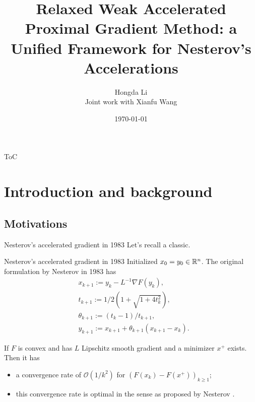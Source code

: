 \documentclass[11pt]{beamer}
\author[Hongda Li]{Hongda Li\\ \vspace{1cm} \tiny{Joint work with Xianfu Wang}}
\title[Thesis Proposal Talk]{
    Relaxed Weak Accelerated Proximal Gradient Method: a Unified Framework for Nesterov's Accelerations
}
\institute[UBCO]{
    University of British Columbia Okanagan
}
\date{\today}
\theoremstyle{definition}
\begin{document}
\begin{frame}
    \titlepage
\end{frame}

\begin{frame}{ToC}
    \tableofcontents
\end{frame}

\section{Introduction and background}
    \subsection{Motivations}
        \begin{frame}{Nesterov's accelerated gradient in 1983}
            Let's recall a classic. 
            \begin{block}{Nesterov's accelerated gradient in 1983}
                Initialized $x_0 = y_0 \in \mathbb R^n$. 
                The original formulation by Nesterov in 1983 \cite{nesterov_method_1983} has
                {\small
                \begin{align*}
                    & x_{k + 1} := y_k - L^{-1}\nabla F(y_k),
                    \\
                    & t_{k + 1} := 1/2\left(1 + \sqrt{1 + 4t_{k}^2}\right),
                    \\
                    & \theta_{k + 1} := (t_{k} - 1)/t_{k + 1}, \label{eqn:example-algorithm}
                    \\
                    & y_{k + 1} := x_{k + 1} + \theta_{k + 1}(x_{k + 1} - x_k).
                \end{align*}    
                }
            \end{block}
            If $F$ is convex and has $L$ Lipschitz smooth gradient and a minimizer $x^+$ exists. 
            Then it has
            \begin{itemize}
                \item a convergence rate of $\mathcal O(1/k^2)$ for $(F(x_k) - F(x^+))_{k \ge 1}$;
                \item this convergence rate is optimal in the sense as proposed by Nesterov \cite{nesterov_lectures_2018}.
            \end{itemize}
        \end{frame}
\end{document}
